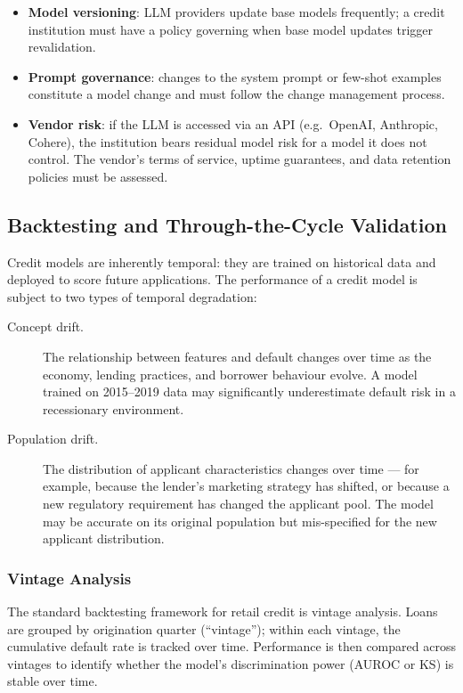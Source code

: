 \begin{context}
\begin{itemize}
  \item \textbf{Model versioning}: LLM providers update base models frequently; a credit institution must have a policy governing when base model updates trigger revalidation.
  \item \textbf{Prompt governance}: changes to the system prompt or few-shot examples constitute a model change and must follow the change management process.
  \item \textbf{Vendor risk}: if the LLM is accessed via an API (e.g.\ OpenAI, Anthropic, Cohere), the institution bears residual model risk for a model it does not control. The vendor's terms of service, uptime guarantees, and data retention policies must be assessed.
\end{itemize}

\subsection{Backtesting and Through-the-Cycle Validation}
\label{subsec:backtesting}

Credit models are inherently temporal: they are trained on historical data and deployed to score future applications. The performance of a credit model is subject to two types of temporal degradation:

\begin{description}
  \item[Concept drift.] The relationship between features and default changes over time as the economy, lending practices, and borrower behaviour evolve. A model trained on 2015--2019 data may significantly underestimate default risk in a recessionary environment.
  \item[Population drift.] The distribution of applicant characteristics changes over time --- for example, because the lender's marketing strategy has shifted, or because a new regulatory requirement has changed the applicant pool. The model may be accurate on its original population but mis-specified for the new applicant distribution.
\end{description}

\subsubsection*{Vintage Analysis}

The standard backtesting framework for retail credit is vintage analysis. Loans are grouped by origination quarter (``vintage''); within each vintage, the cumulative default rate is tracked over time. Performance is then compared across vintages to identify whether the model's discrimination power (AUROC or KS) is stable over time.


\end{context}
